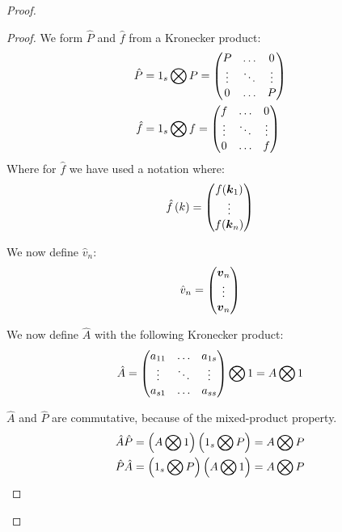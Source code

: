 \begin{proof}
\begin{proof}
We form $\hat{P}$ and $\hat{f}$ from a Kronecker product:
\begin{align}
\hat{P}&=1_{s}\bigotimes P=\begin{pmatrix}P	&\ldots	&0\\
			\vdots &\ddots 	&\vdots\\
			0	&\ldots		&P\\
	\end{pmatrix}\\
\hat{f}&=1_{s}\bigotimes f=\begin{pmatrix}f	&\ldots	&0\\
			\vdots &\ddots 	&\vdots\\
			0	&\ldots	&f\\
	\end{pmatrix}
\end{align}
Where for $\hat{f}$ we have used a notation where:
\begin{equation}
 \hat{f}\left(k\right)=\begin{pmatrix}f({\boldsymbol {k}}_1)\\
			\vdots\\
			f({\boldsymbol {k}}_n)\\
	\end{pmatrix}
\end{equation}


We now define $\hat{v}_n$:
\begin{equation}
\hat{v}_{n}=\begin{pmatrix}
	      {\boldsymbol {v}}_{n}\\
	      \vdots\\
	      {\boldsymbol {v}}_{n}
	      \end{pmatrix}
\end{equation}

We now define $\hat{A}$ with the following Kronecker product:
\begin{equation}
\hat{A}=\begin{pmatrix}
    a_{11}	&\ldots	&a_{1s}\\
    \vdots	&\ddots	&\vdots\\
    a_{s1}	&\ldots	&a_{ss}\\
  \end{pmatrix} \bigotimes 1=A \bigotimes 1
\end{equation}

$\hat{A}$ and $\hat{P}$ are commutative, because of the mixed-product property.
\begin{align}
\hat{A}\hat{P}&=\left(A\bigotimes 1 \right)
  \left(1_{s}\bigotimes P\right)=
	A\bigotimes P\\
    \hat{P}\hat{A}&=
  \left(1_{s}\bigotimes P\right)
	\left(A \bigotimes 1 \right)=
	A\bigotimes P
\end{align}


\end{proof}
\end{proof}
